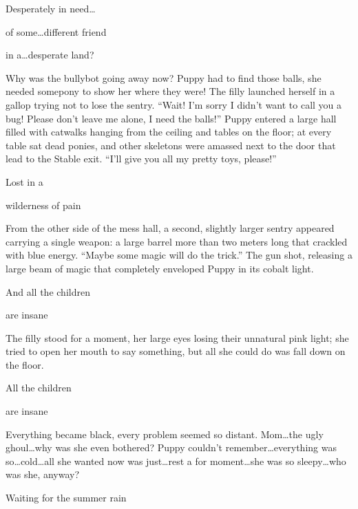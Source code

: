 \begin{song}
Desperately in need\dots

of some\dots different friend

in a\dots desperate land?
\end{song}

Why was the bullybot going away now? Puppy had to find those balls, she needed somepony to show her where they were! The filly launched herself in a gallop trying not to lose the sentry. ``Wait! I'm sorry I didn't want to call you a bug! Please don't leave me alone, I need the balls!'' Puppy entered a large hall filled with catwalks hanging from the ceiling and tables on the floor; at every table sat dead ponies, and other skeletons were amassed next to the door that lead to the Stable exit. ``I'll give you all my pretty toys, please!''


\begin{song}
Lost in a

wilderness of pain
\end{song}

From the other side of the mess hall, a second, slightly larger sentry appeared carrying a single weapon: a large barrel more than two meters long that crackled with blue energy. ``Maybe some magic will do the trick.'' The gun shot, releasing a large beam of magic that completely enveloped Puppy in its cobalt light.


\begin{song}
    And all the children
    
    are insane
\end{song}

The filly stood for a moment, her large eyes losing their unnatural pink light; she tried to open her mouth to say something, but all she could do was fall down on the floor.


\begin{song}
    All the children

    are insane
\end{song}

Everything became black, every problem seemed so distant. Mom\dots the ugly ghoul\dots why was she even bothered? Puppy couldn't remember\dots everything was so\dots cold\dots all she wanted now was just\dots rest a for moment\dots she was so sleepy\dots who was she, anyway?

\begin{song}
Waiting for the summer rain    
\end{song}


